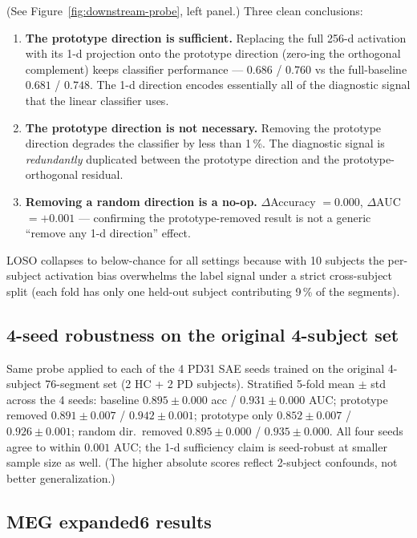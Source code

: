 \documentclass[11pt]{article}
\begin{document}
(See Figure~\ref{fig:downstream-probe}, left panel.) Three clean conclusions:
\begin{enumerate}[leftmargin=1.4em,itemsep=0.2em,topsep=0.3em]
\item \textbf{The prototype direction is sufficient.} Replacing the full
256-d activation with its 1-d projection onto the prototype direction
(zero-ing the orthogonal complement) keeps classifier performance ---
$0.686$ / $0.760$ vs the full-baseline $0.681$ / $0.748$. The 1-d direction
encodes essentially all of the diagnostic signal that the linear classifier
uses.
\item \textbf{The prototype direction is not necessary.} Removing the
prototype direction degrades the classifier by less than 1\,\%. The
diagnostic signal is \emph{redundantly} duplicated between the prototype
direction and the prototype-orthogonal residual.
\item \textbf{Removing a random direction is a no-op.} $\Delta$Accuracy
$=0.000$, $\Delta$AUC $=+0.001$ --- confirming the prototype-removed result
is not a generic ``remove any 1-d direction'' effect.
\end{enumerate}
LOSO collapses to below-chance for all settings because with 10 subjects the
per-subject activation bias overwhelms the label signal under a strict
cross-subject split (each fold has only one held-out subject contributing
9\,\% of the segments).

\subsection{4-seed robustness on the original 4-subject set}

Same probe applied to each of the 4 PD31 SAE seeds trained on the original
4-subject 76-segment set (2 HC + 2 PD subjects). Stratified 5-fold mean
$\pm$ std across the 4 seeds: baseline $0.895 \pm 0.000$ acc / $0.931 \pm 0.000$
AUC; prototype removed $0.891 \pm 0.007$ / $0.942 \pm 0.001$; prototype only
$0.852 \pm 0.007$ / $0.926 \pm 0.001$; random dir.\ removed $0.895 \pm 0.000$ /
$0.935 \pm 0.000$. All four seeds agree to within $0.001$ AUC; the 1-d
sufficiency claim is seed-robust at smaller sample size as well. (The higher
absolute scores reflect 2-subject confounds, not better generalization.)

\subsection{MEG expanded6 results}
\end{document}
